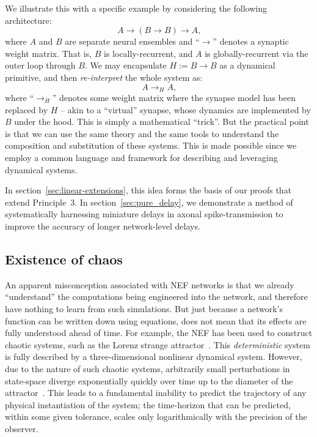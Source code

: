 We illustrate this with a specific example by considering the following architecture:
$$A \rightarrow (B \rightarrow B) \rightarrow A \text{,}$$
where $A$ and $B$ are separate neural ensembles and ``$\rightarrow$'' denotes a synaptic weight matrix.
That is, $B$ is locally-recurrent, and $A$ is globally-recurrent via the outer loop through $B$.
We may encapsulate $H := B \rightarrow B$ as a dynamical primitive, and then \emph{re-interpret} the whole system as:
$$A \rightarrow_H A \text{,}$$
where ``$\rightarrow_H$'' denotes some weight matrix where the synapse model has been replaced by $H$ --
akin to a ``virtual'' synapse, whose dynamics are implemented by $B$ under the hood.
This is simply a mathematical ``trick''.
But the practical point is that we can use the same theory and the same tools to understand the composition and substitution of these systems.
This is made possible since we employ a common language and framework for describing and leveraging dynamical systems.

In section~\ref{sec:linear-extensions}, this idea forms the basis of our proofs that extend Principle~3.
In section~\ref{sec:pure_delay}, we demonstrate a method of systematically harnessing miniature delays in axonal spike-transmission to improve the accuracy of longer network-level delays.


\subsection{Existence of chaos}

An apparent misconception associated with NEF networks is that we already ``understand'' the computations being engineered into the network, and therefore have nothing to learn from such simulations.
But just because a network's function can be written down using equations, does not mean that its effects are fully understood ahead of time.
For example, the NEF has been used to construct chaotic systems, such as the Lorenz strange attractor~\citep{eliasmith2005b}.
This \emph{deterministic} system is fully described by a three-dimensional nonlinear dynamical system.
However, due to the nature of such chaotic systems, arbitrarily small perturbations in state-space diverge exponentially quickly over time up to the diameter of the attractor~\citep[][pp.~328--330]{strogatz2000nonlinear}.
This leads to a fundamental inability to predict the trajectory of any physical instantiation of the system; the time-horizon that can be predicted, within some given tolerance, scales only logarithmically with the precision of the observer.

